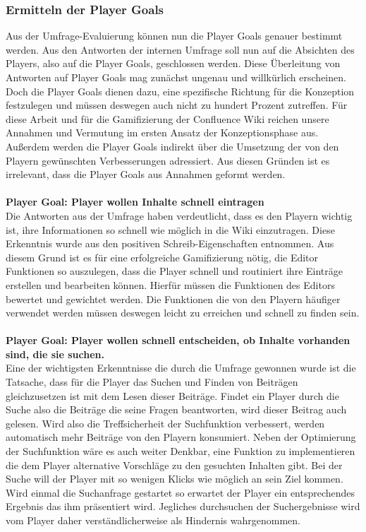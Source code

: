 \documentclass[a4paper,12pt]{scrartcl}
\begin{document}
\subsubsection{Ermitteln der Player Goals}
Aus der Umfrage-Evaluierung können nun die Player Goals genauer bestimmt werden. Aus den Antworten der internen Umfrage soll nun auf die Absichten des Players, also auf die Player Goals, geschlossen werden. Diese Überleitung
von Antworten auf Player Goals mag zunächst ungenau und willkürlich erscheinen. Doch die Player Goals dienen dazu, eine spezifische Richtung für die Konzeption festzulegen und müssen deswegen auch nicht zu hundert Prozent zutreffen. Für diese Arbeit und für die Gamifizierung der Confluence Wiki reichen unsere Annahmen und Vermutung im ersten Ansatz der Konzeptionsphase aus. Außerdem werden die Player Goals indirekt über die Umsetzung der von den Playern gewünschten Verbesserungen adressiert. Aus diesen Gründen ist es irrelevant, dass die Player Goals aus Annahmen geformt werden.
\\\\
\textbf{Player Goal: Player wollen Inhalte schnell eintragen}\\
Die Antworten aus der Umfrage haben verdeutlicht, dass es den Playern wichtig ist, ihre Informationen so schnell wie möglich in die Wiki einzutragen. Diese Erkenntnis wurde aus den positiven Schreib-Eigenschaften entnommen. Aus diesem Grund ist es für eine erfolgreiche Gamifizierung nötig, die Editor Funktionen so auszulegen, dass die Player schnell und routiniert ihre Einträge erstellen und bearbeiten können. Hierfür müssen die Funktionen des Editors bewertet und gewichtet werden. Die Funktionen die von den Playern häufiger verwendet werden müssen deswegen leicht zu erreichen und schnell zu finden sein.
\\\\
\textbf{Player Goal: Player wollen schnell entscheiden, ob Inhalte vorhanden sind, die sie suchen.}\\
Eine der wichtigsten Erkenntnisse die durch die Umfrage gewonnen wurde ist die Tatsache, dass für die Player das Suchen und Finden von Beiträgen gleichzusetzen ist mit dem Lesen dieser Beiträge. Findet ein Player durch die Suche also die Beiträge die seine Fragen beantworten, wird dieser Beitrag auch gelesen. Wird also die Treffsicherheit der Suchfunktion verbessert, werden automatisch mehr Beiträge von den Playern konsumiert. Neben der Optimierung der Suchfunktion wäre es auch weiter Denkbar, eine Funktion zu implementieren die dem Player alternative Vorschläge zu den gesuchten Inhalten gibt. Bei der Suche will der Player mit so wenigen Klicks wie möglich an sein Ziel kommen. Wird einmal die Suchanfrage gestartet so erwartet der Player ein entsprechendes Ergebnis das ihm präsentiert wird. Jegliches durchsuchen der Suchergebnisse wird vom Player daher verständlicherweise als Hindernis wahrgenommen. 
\end{document}
